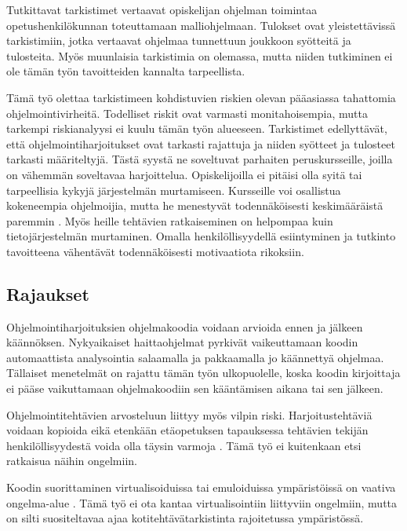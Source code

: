 Tutkittavat tarkistimet vertaavat opiskelijan ohjelman toimintaa
opetushenkilökunnan toteuttamaan malliohjelmaan. Tulokset ovat yleistettävissä
tarkistimiin, jotka vertaavat ohjelmaa tunnettuun joukkoon syötteitä ja
tulosteita. Myös muunlaisia tarkistimia on olemassa, mutta niiden tutkiminen ei
ole tämän työn tavoitteiden kannalta tarpeellista.

Tämä työ olettaa tarkistimeen kohdistuvien riskien olevan pääasiassa
tahattomia ohjelmointivirheitä. Todelliset riskit ovat varmasti
monitahoisempia, mutta tarkempi riskianalyysi ei kuulu tämän työn alueeseen.
Tarkistimet edellyttävät, että ohjelmointiharjoitukset ovat tarkasti rajattuja
ja niiden syötteet ja tulosteet tarkasti määriteltyjä. Tästä syystä ne
soveltuvat parhaiten peruskursseille, joilla on vähemmän soveltavaa
harjoittelua. Opiskelijoilla ei pitäisi olla syitä tai tarpeellisia kykyjä
järjestelmän murtamiseen. Kursseille voi osallistua kokeneempia ohjelmoijia,
mutta he menestyvät todennäköisesti keskimääräistä paremmin
\citep{hagan2000does}. Myös heille tehtävien ratkaiseminen on helpompaa kuin
tietojärjestelmän murtaminen. Omalla henkilöllisyydellä esiintyminen ja tutkinto
tavoitteena vähentävät todennäköisesti motivaatiota rikoksiin.

\subsection{Rajaukset}

Ohjelmointiharjoituksien ohjelmakoodia voidaan arvioida ennen ja jälkeen
käännöksen. Nykyaikaiset haittaohjelmat pyrkivät vaikeuttamaan koodin
automaattista analysointia salaamalla ja pakkaamalla jo käännettyä ohjelmaa.
Tällaiset menetelmät on rajattu tämän työn ulkopuolelle, koska koodin
kirjoittaja ei pääse vaikuttamaan ohjelmakoodiin sen kääntämisen aikana tai sen
jälkeen.

Ohjelmointitehtävien arvosteluun liittyy myös vilpin riski. Harjoitustehtäviä
voidaan kopioida eikä etenkään etäopetuksen tapauksessa tehtävien tekijän
henkilöllisyydestä voida olla täysin varmoja \citep{carter2003shall}. Tämä työ
ei kuitenkaan etsi ratkaisua näihin ongelmiin. 

Koodin suorittaminen virtualisoiduissa tai emuloiduissa ympäristöissä on
vaativa on\-gel\-ma-alue \citep{kesti2010}. Tämä työ ei ota kantaa virtualisointiin
liittyviin ongelmiin, mutta on silti suositeltavaa ajaa kotitehtävätarkistinta
rajoitetussa ympäristössä.


